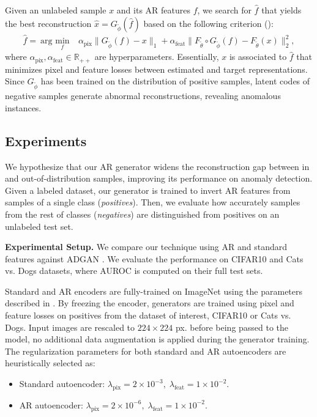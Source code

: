 Given an unlabeled sample $x$ and its AR features $f$, we search for $\hat{f}$ that yields the best reconstruction $\hat{x}=G_{\tilde{\phi}}(\hat{f})$ based on the following criterion ():
\begin{align}
    \label{eq:anomaly_detection}
    \hat{f}=\ \text{arg }\underset{f}{\text{min}}&\ \alpha_{\text{pix}}\|G_{\tilde{\phi}}(f)-x\|_{1}+ \alpha_{\text{feat}}\|F_{\tilde{\theta}}\circ G_{\tilde{\phi}}(f)-F_{\tilde{\theta}}(x)\|_{2}^{2},
\end{align}
where $\alpha_{\text{pix}}, \alpha_{\text{feat}} \in \mathbb{R}_{++}$ are hyperparameters. Essentially, $x$ is associated to $\hat{f}$ that minimizes pixel and feature losses between estimated and target representations. Since $G_{\tilde{\phi}}$ has been trained on the distribution of positive samples, latent codes of negative samples generate abnormal reconstructions, revealing anomalous instances.

\subsection{Experiments}
We hypothesize that our AR generator widens the reconstruction gap between in and out-of-distribution samples, improving its performance on anomaly detection. Given a labeled dataset, our generator is trained to invert AR features from samples of a single class (\textit{positives}). Then, we evaluate how accurately samples from the rest of classes (\textit{negatives}) are distinguished from positives on an unlabeled test set.


\textbf{Experimental Setup.} We compare our technique using AR and standard features against ADGAN \cite{deecke_2018_image,golan_2018_deep}. We evaluate the performance on CIFAR10 and Cats vs. Dogs \cite{parkhi_2012_cats} datasets, where AUROC is computed on their full test sets.

Standard and AR encoders are fully-trained on ImageNet using the parameters described in . By freezing the encoder, generators are trained using pixel and feature losses on positives from the dataset of interest, CIFAR10 or Cats vs. Dogs. Input images are rescaled to $224 \times 224$ px. before being passed to the model, no additional data augmentation is applied during the generator training. The regularization parameters for both standard and AR autoencoders are heuristically selected as:
\vspace{-0.1\baselineskip}
\begin{itemize}
    \setlength\itemsep{0.1\baselineskip}
    \item Standard autoencoder: $\lambda_{\text{pix}}=2\times 10^{-3},\; \lambda_{\text{feat}}=1\times 10^{-2}$.
    \item AR autoencoder: $\lambda_{\text{pix}}=2\times 10^{-6},\; \lambda_{\text{feat}}=1\times 10^{-2}$.
\end{itemize}

